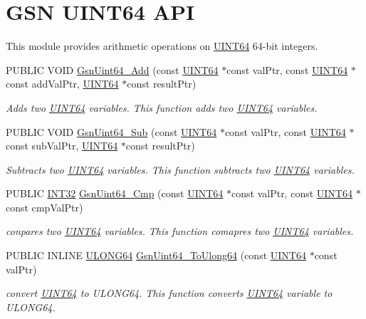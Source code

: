 \hypertarget{a00633}{
\section{GSN UINT64 API}
\label{a00633}
}


This module provides arithmetic operations on \hyperlink{a00462}{UINT64} 64-\/bit integers.  


\begin{DoxyCompactItemize}
\item 
PUBLIC VOID \hyperlink{a00633_gac563e9d0ef4149a2e6bf4b69848b8350}{GsnUint64\_\-Add} (const \hyperlink{a00462}{UINT64} $\ast$const valPtr, const \hyperlink{a00462}{UINT64} $\ast$const addValPtr, \hyperlink{a00462}{UINT64} $\ast$const resultPtr)
\begin{DoxyCompactList}\small\item\em Adds two \hyperlink{a00462}{UINT64} variables. This function adds two \hyperlink{a00462}{UINT64} variables. \end{DoxyCompactList}\item 
PUBLIC VOID \hyperlink{a00633_gaa28251a236e953a0f7d7c9cc6d2a4f56}{GsnUint64\_\-Sub} (const \hyperlink{a00462}{UINT64} $\ast$const valPtr, const \hyperlink{a00462}{UINT64} $\ast$const subValPtr, \hyperlink{a00462}{UINT64} $\ast$const resultPtr)
\begin{DoxyCompactList}\small\item\em Subtracts two \hyperlink{a00462}{UINT64} variables. This function subtracts two \hyperlink{a00462}{UINT64} variables. \end{DoxyCompactList}\item 
PUBLIC \hyperlink{a00660_ga63021d67d54286c2163bcdb43a6f2569}{INT32} \hyperlink{a00633_ga6f146e62b0ba7c60b788e7567b9a43d7}{GsnUint64\_\-Cmp} (const \hyperlink{a00462}{UINT64} $\ast$const valPtr, const \hyperlink{a00462}{UINT64} $\ast$const cmpValPtr)
\begin{DoxyCompactList}\small\item\em conpares two \hyperlink{a00462}{UINT64} variables. This function comapres two \hyperlink{a00462}{UINT64} variables. \end{DoxyCompactList}\item 
PUBLIC INLINE \hyperlink{a00660_ga28961430434ccabca6862ea93fe9a15b}{ULONG64} \hyperlink{a00633_ga91c8c7e7593d471df3663ac581c75140}{GsnUint64\_\-ToUlong64} (const \hyperlink{a00462}{UINT64} $\ast$const valPtr)
\begin{DoxyCompactList}\small\item\em convert \hyperlink{a00462}{UINT64} to ULONG64. This function converts \hyperlink{a00462}{UINT64} variable to ULONG64. \end{DoxyCompactList}\item 

\end{DoxyCompactItemize}
